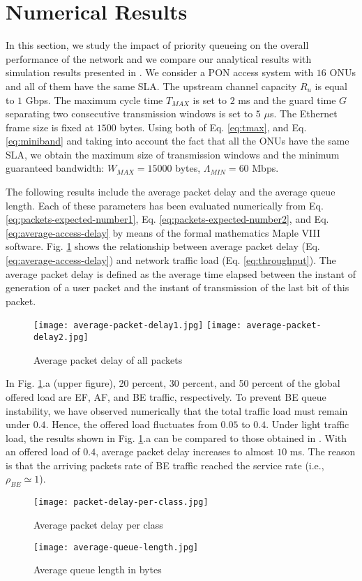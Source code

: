 \documentclass[a4paper,10pt]{IEEEtran}
\begin{document}
\section{Numerical Results}
In this section, we study the impact of priority queueing on the
overall performance of the network and we compare our analytical
results with simulation results presented in \cite{Luo:2005}. We
consider a PON access system with $16$ ONUs and all of them have the
same SLA. The upstream channel capacity $R_{u}$ is equal to $1$
Gbps. The maximum cycle time $T_{MAX}$ is set to $2$ ms and the
guard time $G$ separating two consecutive transmission windows is
set to $5$ $\mu$s. The Ethernet frame size is fixed at $1500$ bytes.
Using both of Eq. \ref{eq:tmax}, and Eq. \ref{eq:miniband} and
taking into account the fact that all the ONUs have the same SLA, we
obtain the maximum size of transmission windows and the minimum
guaranteed bandwidth: $W_{MAX}=15000$ bytes, $\Lambda_{MIN}=60$
Mbps.

The following results include the average packet delay and the
average queue length. Each of these parameters has been evaluated
numerically from Eq. \ref{eq:packets-expected-number1}, Eq.
\ref{eq:packets-expected-number2}, and Eq.
\ref{eq:average-access-delay} by means of the formal mathematics
Maple VIII software. Fig. \ref{results1-2} shows the relationship
between average packet delay (Eq. \ref{eq:average-access-delay}) and
network traffic load (Eq. \ref{eq:throughput}). The average packet
delay is defined as the average time elapsed between the instant of
generation of a user packet and the instant of transmission of the
last bit of this packet.
\begin{figure}
\centering
\texttt{[image: average-packet-delay1.jpg]}
\texttt{[image: average-packet-delay2.jpg]}
\caption{Average packet delay of all packets}\label{results1-2}
\end{figure}

In Fig. \ref{results1-2}.a (upper figure), 20 percent, 30 percent,
and 50 percent of the global offered load are EF, AF, and BE
traffic, respectively. To prevent BE queue instability, we have
observed numerically that the total traffic load must remain under
$0.4$. Hence, the offered load fluctuates from $0.05$ to $0.4$.
Under light traffic load, the results shown in Fig.
\ref{results1-2}.a can be compared to those obtained in
\cite{Luo:2005}. With an offered load of $0.4$, average packet delay
increases to almost $10$ ms. The reason is that the arriving packets
rate of BE traffic reached the service rate (i.e., $\rho_{BE} \simeq
1$).
\begin{figure}[!h]
\centering
\texttt{[image: packet-delay-per-class.jpg]}
\caption{Average packet delay per class} \label{results3}
\end{figure}
\begin{figure}
\centering
\texttt{[image: average-queue-length.jpg]}
\caption{Average queue length in bytes} \label{results4}
\end{figure}
\end{document}
